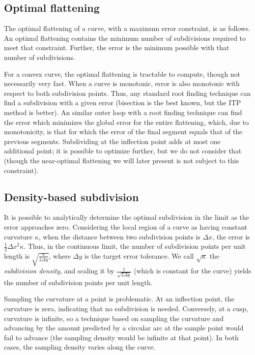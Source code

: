 \documentclass[format=acmsmall]{acmart}
\begin{document}
\subsection{Optimal flattening}

The optimal flattening of a curve, with a maximum error constraint, is as follows. An optimal flattening contains the minimum number of subdivisions required to meet that constraint. Further, the error is the minimum possible with that number of subdivisions.

For a convex curve, the optimal flattening is tractable to compute, though not necessarily very fast. When a curve is monotonic, error is also monotonic with respect to both subdivision points. Thus, any standard root finding technique can find a subdivision with a given error (bisection is the best known, but the ITP method \cite{Oliveira2020} is better). An similar outer loop with a root finding technique can find the error which minimizes the global error for the entire flattening, which, due to monotonicity, is that for which the error of the final segment equals that of the previous segments. Subdividing at the inflection point adds at most one additional point; it is possible to optimize further, but we do not consider that (though the near-optimal flattening we will later present is not subject to this constraint).

\subsection{Density-based subdivision}

It is possible to analytically determine the optimal subdivision in the limit as the error approaches zero. Considering the local region of a curve as having constant curvature $\kappa$, when the distance between two subdivision points is $\Delta x$, the error is $\frac{1}{2}\Delta x^2 \kappa$. Thus, in the continuous limit, the number of subdivision points per unit length is $\sqrt{\frac{\kappa}{2\Delta y}}$, where $\Delta y$ is the target error tolerance. We call $\sqrt{\kappa}$ the \emph{subdivision density}, and scaling it by $\frac{1}{\sqrt{2\Delta y}}$ (which is constant for the curve) yields the number of subdivision points per unit length.

Sampling the curvature at a point is problematic. At an inflection point, the curvature is zero, indicating that no subdivision is needed. Conversely, at a cusp, curvature is infinite, so a technique based on sampling the curvature and advancing by the amount predicted by a circular arc at the sample point would fail to advance (the sampling density would be infinite at that point). In both cases, the sampling density varies along the curve.
\end{document}
